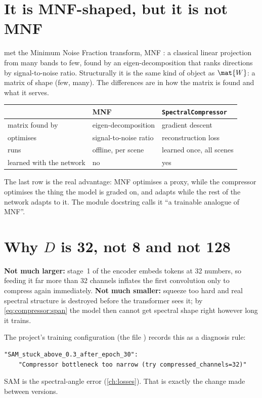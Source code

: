 \section{It is MNF-shaped, but it is not MNF}\label{sec:compressor:mnf}

 met the Minimum Noise Fraction transform, MNF \citep{green1988transformation}: a
classical linear projection from many bands to few, found by an eigen-decomposition that ranks
directions by signal-to-noise ratio. Structurally it is the same kind of object as $\mat{W}$: a
matrix of shape (few, many). The differences are in how the matrix is found and what it serves.

\begin{center}
\begin{tabular}{lll}
\toprule
& MNF & \texttt{SpectralCompressor}\\
\midrule
matrix found by & eigen-decomposition & gradient descent\\
optimises & signal-to-noise ratio & reconstruction loss\\
runs & offline, per scene & learned once, all scenes\\
learned with the network & no & yes\\
\bottomrule
\end{tabular}
\end{center}

The last row is the real advantage: MNF optimises a proxy, while the compressor optimises the thing the
model is graded on, and adapts while the rest of the network adapts to it. The module docstring calls
it ``a trainable analogue of MNF''.

\section{Why $D$ is 32, not 8 and not 128}\label{sec:compressor:width}

\textbf{Not much larger:} stage~1 of the encoder embeds tokens at 32 numbers, so feeding it far more
than 32 channels inflates the first convolution only to compress again immediately.
\textbf{Not much smaller:} squeeze too hard and real spectral structure is destroyed before the
transformer sees it; by \cref{eq:compressor:span} the model then cannot get spectral shape right however
long it trains.

The project's training configuration (the file
) records this as a diagnosis rule:
\begin{lstlisting}
"SAM_stuck_above_0.3_after_epoch_30":
    "Compressor bottleneck too narrow (try compressed_channels=32)"
\end{lstlisting}
SAM is the spectral-angle error
(\cref{ch:losses}). That is exactly the change made between versions.

